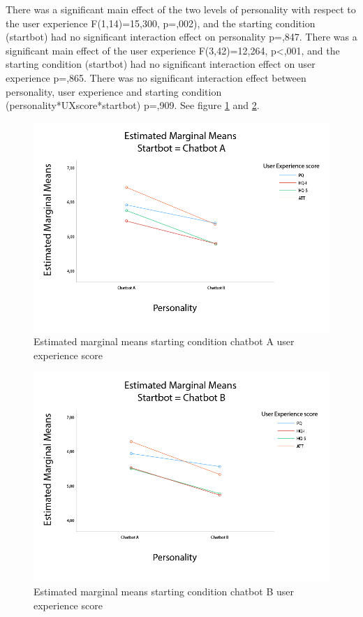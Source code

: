 There was a significant main effect of the two levels of personality with respect to the user experience F(1,14)=15,300, p=,002), and the starting condition (startbot) had no significant interaction effect on personality p=,847. There was a significant main effect of the user experience F(3,42)=12,264, p<,001, and the starting condition (startbot) had no significant interaction effect on user experience p=,865. There was no significant interaction effect between personality, user experience and starting condition (personality*UXscore*startbot) p=,909. See figure \ref{fig:startA} and \ref{fig:startB}.

\begin{figure}[h]
    \centering
    \includegraphics[scale=0.4]{figures/MMeanStartbotA.png}
    \caption{Estimated marginal means starting condition chatbot A user experience score}
    \label{fig:startA}
\end{figure}

\begin{figure}[h]
    \centering
    \includegraphics[scale=0.4]{figures/MMeanStartbotB.png}
    \caption{Estimated marginal means starting condition chatbot B user experience score}
    \label{fig:startB}
\end{figure}

